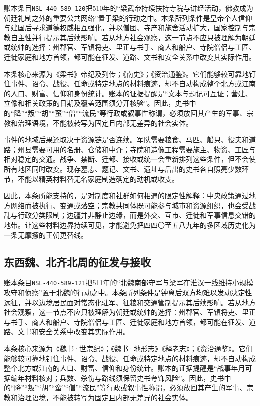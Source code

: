 账本条目\texttt{NSL-440-589-120}把510年的“梁武帝持续扶持寺院与讲经活动，佛教成为朝廷礼制之外的重要公共网络”置于梁的行动之中。本条所列条件是皇帝个人信仰与建国后寻求道德权威相互强化，并以僧团、寺产和施舍活动扩大，国家控制与宗教自主性并行提示其后续影响。若从地方社会观察，这一节点不应只被理解为朝廷或统帅的选择：州郡官、军镇将吏、里正与书手、商人和船户、寺院僧侣与工匠、迁徙家庭和地方首领，都可能在征发、道路、文书和安全关系中改变其实际作用。

本条核心来源为《梁书》帝纪及列传；《南史》；《资治通鉴》。它们能够较可靠地钉住事件、诏令、战役、任命或特定地点的材料痕迹，却不自动构成整个北方或江南的人口、财富、信仰和身份统计。账本的证据提醒是“文本与题记可互证；营建、立像和相关政策的日期及覆盖范围须分开核验”。因此，史书中的“降”“叛”“胡”“蛮”“僧”“流民”等行政或叙事性称谓，必须放回其产生的军事、宗教和治理语境，不能被转写为固定且内部无差异的社会实体。

事件的地域后果还取决于资源链是否连续。军队需要粮食、马匹、船只、役夫和道路；州县需要可用的名册、仓储和中介；寺院和造像工程需要施主、物资、工匠与相对稳定的交通。战争、禁断、迁都、接收或统一会重新排列这些条件，但不会使所有地区同时改变。现存墓志、题记、文书、遗址与后出的史书各自照亮少数环节，不能以精英材料替无名家庭制造确定的动机或收支。

因此，本条所能支持的，是对制度和社群如何相遇的限定性解释：中央政策通过地方网络而被执行、变通或落空；宗教共同体既可能参与城市和资源组织，也会受战乱与行政分类限制；边疆并非静止边缘，而是外交、互市、迁徙和军事信息交错的地带。让这些材料边界持续可见，才能避免把四四〇至五八九年的多区域历史化为一条无摩擦的王朝更替线。

\subsection{东西魏、北齐北周的征发与接收}

账本条目\texttt{NSL-440-589-121}把511年的“北魏南部守军与梁军在淮汉一线维持小规模攻守和侦察”置于北魏的行动之中。本条所列条件是钟离后双方均难以发动决定性远征，并以边境居民面对常态化驻军、征粮和交通管制提示其后续影响。若从地方社会观察，这一节点不应只被理解为朝廷或统帅的选择：州郡官、军镇将吏、里正与书手、商人和船户、寺院僧侣与工匠、迁徙家庭和地方首领，都可能在征发、道路、文书和安全关系中改变其实际作用。

本条核心来源为《魏书·世宗纪》；《魏书·地形志》《释老志》；《资治通鉴》。它们能够较可靠地钉住事件、诏令、战役、任命或特定地点的材料痕迹，却不自动构成整个北方或江南的人口、财富、信仰和身份统计。账本的证据提醒是“战事年月可据编年材料核对；兵数、杀伤与路线须保留史书夸饰风险”。因此，史书中的“降”“叛”“胡”“蛮”“僧”“流民”等行政或叙事性称谓，必须放回其产生的军事、宗教和治理语境，不能被转写为固定且内部无差异的社会实体。

